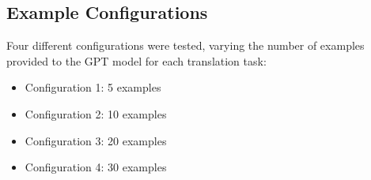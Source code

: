 \documentclass[11pt,a4paper]{article}
\begin{document}
\subsection{Example Configurations}
Four different configurations were tested, varying the number of examples provided to the GPT model for each translation task:

\begin{itemize}
    \item Configuration 1: 5 examples
    \item Configuration 2: 10 examples
    \item Configuration 3: 20 examples
    \item Configuration 4: 30 examples
\end{itemize}




\end{document}
